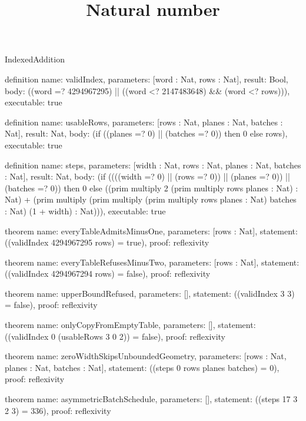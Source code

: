 \begin{lexlean}{IndexedAddition}
\title{Natural number}
\begin{semanticmodule}
definition{
  name: validIndex,
  parameters: [word : Nat, rows : Nat],
  result: Bool,
  body: ((word =? 4294967295) || ((word <? 2147483648) && (word <? rows))),
  executable: true
}

definition{
  name: usableRows,
  parameters: [rows : Nat, planes : Nat, batches : Nat],
  result: Nat,
  body: (if ((planes =? 0) || (batches =? 0)) then 0 else rows),
  executable: true
}

definition{
  name: steps,
  parameters: [width : Nat, rows : Nat, planes : Nat, batches : Nat],
  result: Nat,
  body: (if ((((width =? 0) || (rows =? 0)) || (planes =? 0)) || (batches =? 0)) then 0 else ((prim multiply 2 (prim multiply rows planes : Nat) : Nat) + (prim multiply (prim multiply (prim multiply rows planes : Nat) batches : Nat) (1 + width) : Nat))),
  executable: true
}

theorem{
  name: everyTableAdmitsMinusOne,
  parameters: [rows : Nat],
  statement: ((validIndex 4294967295 rows) = true),
  proof: reflexivity{}
}

theorem{
  name: everyTableRefusesMinusTwo,
  parameters: [rows : Nat],
  statement: ((validIndex 4294967294 rows) = false),
  proof: reflexivity{}
}

theorem{
  name: upperBoundRefused,
  parameters: [],
  statement: ((validIndex 3 3) = false),
  proof: reflexivity{}
}

theorem{
  name: onlyCopyFromEmptyTable,
  parameters: [],
  statement: ((validIndex 0 (usableRows 3 0 2)) = false),
  proof: reflexivity{}
}

theorem{
  name: zeroWidthSkipsUnboundedGeometry,
  parameters: [rows : Nat, planes : Nat, batches : Nat],
  statement: ((steps 0 rows planes batches) = 0),
  proof: reflexivity{}
}

theorem{
  name: asymmetricBatchSchedule,
  parameters: [],
  statement: ((steps 17 3 2 3) = 336),
  proof: reflexivity{}
}
\end{semanticmodule}
\end{lexlean}

